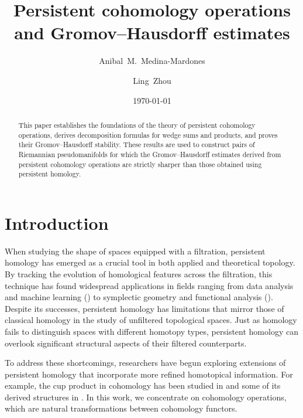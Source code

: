 \documentclass{amsart}
\title[Persistent cohomology operations]{Persistent cohomology operations \\ and Gromov--Hausdorff estimates}
\author{Anibal~M.~Medina-Mardones}
\author{Ling~Zhou}
\date{\today}
\theoremstyle{definition}
\theoremstyle{theorem}
\begin{document}
\begin{abstract}
	This paper establishes the foundations of the theory of persistent cohomology operations, derives decomposition formulas for wedge sums and products, and proves their Gromov--Hausdorff stability.
	These results are used to construct pairs of Riemannian pseudomanifolds for which the Gromov--Hausdorff estimates derived from persistent cohomology operations are strictly sharper than those obtained using persistent homology.
\end{abstract}

	\maketitle
	\tableofcontents



\section{Introduction} \label{s:introduction}

When studying the shape of spaces equipped with a filtration, persistent homology has emerged as a crucial tool in both applied and theoretical topology.
By tracking the evolution of homological features across the filtration, this technique has found widespread applications in fields ranging from data analysis and machine learning (\cite{carlsson2013viral, lee2017quantifying}) to symplectic geometry and functional analysis (\cite{polterovich2020persistence, medina2023fuct_top}).
Despite its successes, persistent homology has limitations that mirror those of classical homology in the study of unfiltered topological spaces.
Just as homology fails to distinguish spaces with different homotopy types, persistent homology can overlook significant structural aspects of their filtered counterparts.

To address these shortcomings, researchers have begun exploring extensions of persistent homology that incorporate more refined homotopical information.
For example, the cup product in cohomology has been studied in \cite{contessoto_et_al:LIPIcs.SoCG.2022.31, memoli2024persistent, huang2005cup, yarmola2010persistence, contreras2022persistent} and some of its derived structures in \cite{herscovich2018higher, ginot2019distances, belchi2022persistence, zhou2023persistent, hess2024minimalmodels}.
In this work, we concentrate on cohomology operations, which are natural transformations between cohomology functors.
\end{document}
